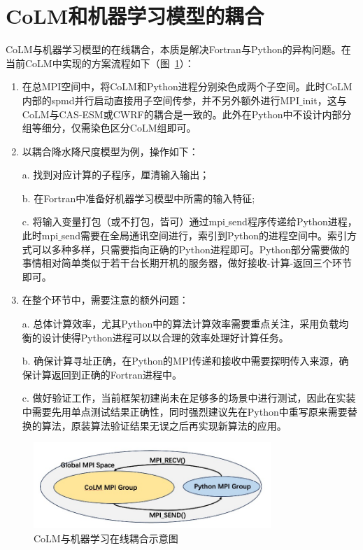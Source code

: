 \section{CoLM和机器学习模型的耦合}\label{CoLM和机器学习模型在线耦合}
CoLM与机器学习模型的在线耦合，本质是解决Fortran与Python的异构问题。在当前CoLM中实现的方案流程如下（图~\ref{fig:colmml耦合图}）：
\begin{enumerate}
    \item 在总MPI空间中，将CoLM和Python进程分别染色成两个子空间。此时CoLM内部的spmd并行启动直接用子空间传参，并不另外额外进行MPI$\_$init，这与CoLM与CAS-ESM或CWRF的耦合是一致的。此外在Python中不设计内部分组等细分，仅需染色区分CoLM组即可。
    \item 以耦合降水降尺度模型为例，操作如下：
    
    a. 找到对应计算的子程序，厘清输入输出；
    
    b. 在Fortran中准备好机器学习模型中所需的输入特征; 
    
    c. 将输入变量打包（或不打包，皆可）通过mpi$\_$send程序传递给Python进程，此时mpi$\_$send需要在全局通讯空间进行，索引到Python的进程空间中。索引方式可以多种多样，只需要指向正确的Python进程即可。Python部分需要做的事情相对简单类似于若干台长期开机的服务器，做好接收-计算-返回三个环节即可。
    \item 在整个环节中，需要注意的额外问题：
    
    a. 总体计算效率，尤其Python中的算法计算效率需要重点关注，采用负载均衡的设计使得Python进程可以以合理的效率处理好计算任务。
    
    b. 确保计算寻址正确，在Python的MPI传递和接收中需要探明传入来源，确保计算返回到正确的Fortran进程中。
    
    c. 做好验证工作，当前框架初建尚未在足够多的场景中进行测试，因此在实装中需要先用单点测试结果正确性，同时强烈建议先在Python中重写原来需要替换的算法，原装算法验证结果无误之后再实现新算法的应用。
\end{enumerate}

{
\begin{figure}[htbp]
\centering
\includegraphics[width=0.8\textwidth]{Figures/尺度转换/colmml耦合图.jpg}
\caption{CoLM与机器学习在线耦合示意图}
\label{fig:colmml耦合图}
\end{figure}
}
